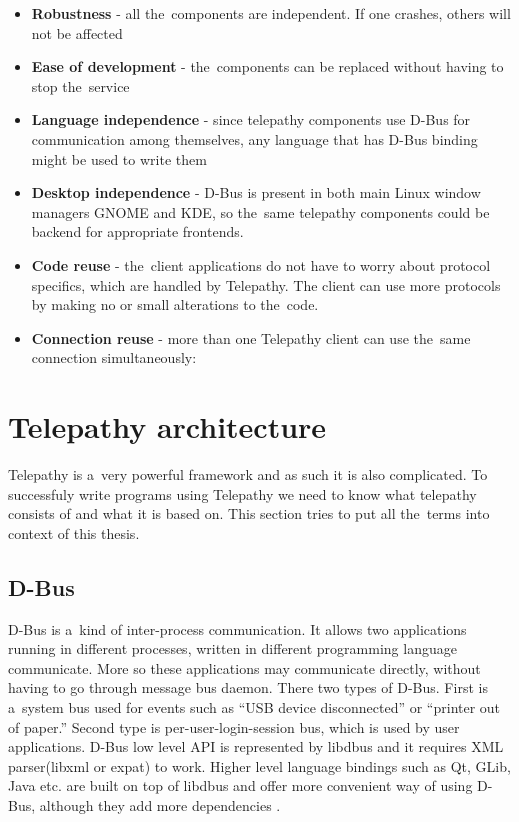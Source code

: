\begin{itemize}

	\item {\bf Robustness} - all the~components are independent. If one crashes, others will not be affected

	\item {\bf Ease of development} - the~components can be replaced without having to stop the~service 

	\item {\bf Language independence} - since telepathy components use D-Bus for communication among themselves, any language that has D-Bus binding might be used to write them

	\item {\bf Desktop independence} - D-Bus is present in both main Linux window managers GNOME and KDE, so the~same telepathy components could be backend for appropriate frontends.

	\item {\bf Code reuse} - the~client applications do not have to worry about protocol specifics, which are handled by Telepathy. The client can use more protocols by making no or small alterations to the~code.

	\item {\bf Connection reuse} - more than one Telepathy client can use the~same connection simultaneously:
\end{itemize}

\section{Telepathy architecture}
Telepathy is a~very powerful framework and as such it is also complicated. To successfuly write programs using Telepathy we need to know what telepathy consists of and what it is based on. This section tries to put all the~terms into context of this thesis.  

\subsection*{D-Bus}
D-Bus is a~kind of inter-process communication. It allows two applications running in different processes, written in different programming language communicate. More so these applications may communicate directly, without having to go through message bus daemon. There two types of D-Bus. First is a~system bus used for events such as ``USB device disconnected'' or ``printer out of paper.'' Second type is per-user-login-session bus, which is used by user applications. D-Bus low level API is represented by libdbus and it requires XML parser(libxml or expat) to work. Higher level language bindings such as Qt, GLib, Java etc. are built on top of libdbus and offer more convenient way of using D-Bus, although they add more dependencies \cite{dbus,TPWiki}.

